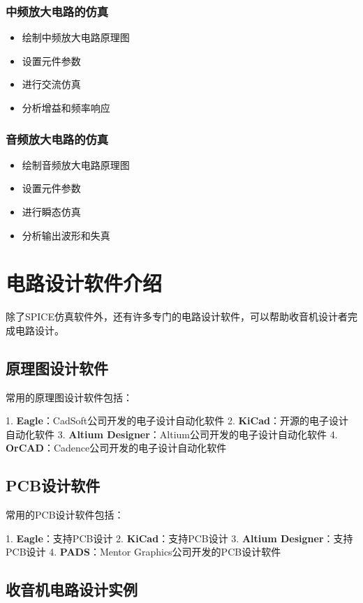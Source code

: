 \documentclass[12pt,UTF8]{ctexbook}
\begin{document}
\subsection{中频放大电路的仿真}\begin{itemize}
  \item 绘制中频放大电路原理图
  \item 设置元件参数
  \item 进行交流仿真
  \item 分析增益和频率响应\end{itemize}

\subsection{音频放大电路的仿真}\begin{itemize}
  \item 绘制音频放大电路原理图
  \item 设置元件参数
  \item 进行瞬态仿真
  \item 分析输出波形和失真\end{itemize}

\chapter{电路设计软件介绍}

除了SPICE仿真软件外，还有许多专门的电路设计软件，可以帮助收音机设计者完成电路设计。

\section{原理图设计软件}

常用的原理图设计软件包括：

1. \textbf{Eagle}：CadSoft公司开发的电子设计自动化软件
2. \textbf{KiCad}：开源的电子设计自动化软件
3. \textbf{Altium Designer}：Altium公司开发的电子设计自动化软件
4. \textbf{OrCAD}：Cadence公司开发的电子设计自动化软件

\section{PCB设计软件}

常用的PCB设计软件包括：

1. \textbf{Eagle}：支持PCB设计
2. \textbf{KiCad}：支持PCB设计
3. \textbf{Altium Designer}：支持PCB设计
4. \textbf{PADS}：Mentor Graphics公司开发的PCB设计软件

\section{收音机电路设计实例}
\end{document}
